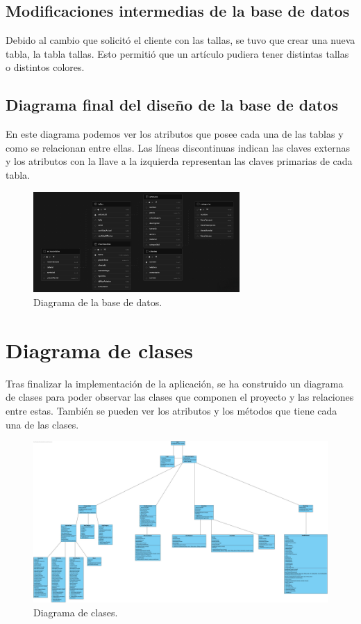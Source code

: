\subsection{Modificaciones intermedias de la base de datos}

Debido al cambio que solicitó el cliente con las tallas, se tuvo que crear una nueva tabla, la tabla tallas. Esto permitió que un artículo pudiera tener distintas tallas o distintos colores. 


\subsection{Diagrama final del diseño de la base de datos}

En este diagrama podemos ver los atributos que posee cada una de las tablas y como se relacionan entre ellas. Las líneas discontinuas indican las claves externas y los atributos con la llave a la izquierda representan las claves primarias de cada tabla. 

\begin{figure}[H]
	\centering
	\includegraphics[width=0.7\textwidth]{imagenes/imagenesDiagramas/diagramaBD.png}
	\caption{Diagrama de la base de datos.}
	\label{fig:diagramaBD}
\end{figure}

\section{Diagrama de clases}

Tras finalizar la implementación de la aplicación, se ha construido un diagrama de clases para poder observar las clases que componen el proyecto y las relaciones entre estas. También se pueden ver los atributos y los métodos que tiene cada una de las clases. 

\newpage

\begin{figure}[H]
	\centering
	\includegraphics[width=1.6\textwidth, angle=90]{imagenes/imagenesDiagramas/diagramaClases.jpg}
	\caption{Diagrama de clases.}
	\label{fig:diagramaClases}
\end{figure}
